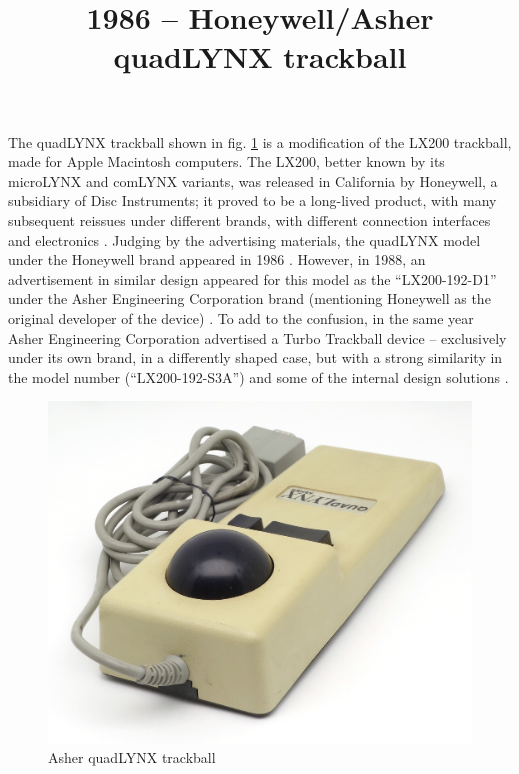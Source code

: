 \documentclass[11pt, a4paper]{article}
\begin{document}
\title{1986 -- Honeywell/Asher quadLYNX trackball}
\date{}
\maketitle
{}
The quadLYNX trackball shown in fig. \ref{fig:quadLYNXPic} is a modification of the LX200 trackball, made for Apple Macintosh computers. The LX200, better known by its microLYNX and comLYNX variants, was released in California by Honeywell, a subsidiary of Disc Instruments; it proved to be a long-lived product, with many subsequent reissues under different brands, with different connection interfaces and electronics \cite{lx200}. Judging by the advertising materials, the quadLYNX model under the Honeywell brand appeared in 1986 \cite{honeywell}. However, in 1988, an advertisement in similar design appeared for this model as the ``LX200-192-D1'' under the Asher Engineering Corporation brand (mentioning Honeywell as the original developer of the device) \cite{asher}. To add to the confusion, in the same year Asher Engineering Corporation advertised a Turbo Trackball device -- exclusively under its own brand, in a differently shaped case, but with a strong similarity in the model number (``LX200-192-S3A'') and some of the internal design solutions \cite{turbo}.

\begin{figure}[h]
    \centering
    \includegraphics[scale=0.78]{1986_honeywell_asher_quadlynx_trackball/pic_30.jpg}
    \caption{Asher quadLYNX trackball}
    \label{fig:quadLYNXPic}
\end{figure}
\end{document}
